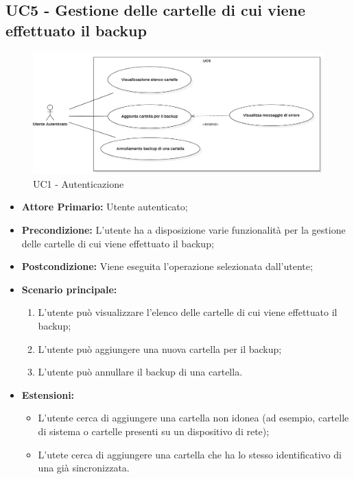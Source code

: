 \subsection{UC5 - Gestione delle cartelle di cui viene effettuato il backup}
\begin{figure}[H]
    \centering
    \includegraphics[scale = 0.4]{components/img/UC5.png}
    \caption{UC1 - Autenticazione}
\end{figure}
\begin{itemize}
\item \textbf{Attore Primario:} Utente autenticato;
\item \textbf{Precondizione:} L'utente ha a disposizione varie funzionalità per la gestione delle cartelle di cui viene effettuato il backup;
\item \textbf{Postcondizione:} Viene eseguita l'operazione selezionata dall'utente;
\item \textbf{Scenario principale:}
    \begin{enumerate}
    \item L'utente può visualizzare l'elenco delle cartelle di cui viene effettuato il backup;
    \item L'utente può aggiungere una nuova cartella per il backup;
    \item L'utente può annullare il backup di una cartella.
    \end{enumerate}
\item \textbf{Estensioni:}
\begin{itemize}
\item L'utente cerca di aggiungere una cartella non idonea (ad esempio, cartelle di sistema o cartelle presenti su un dispositivo di rete);
\item L'utete cerca di aggiungere una cartella che ha lo stesso identificativo di una già sincronizzata.
\end{itemize}
\end{itemize}